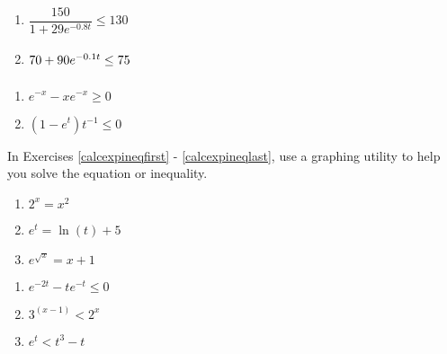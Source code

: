 \documentclass{ximera}
\begin{document}
\begin{multicols}{2} 
\begin{enumerate}
\setcounter{enumi}{\value{HW}}

\item $\dfrac{150}{1 + 29e^{-0.8t}} \leq 130$

\item $\vphantom{\dfrac{150}{1 + 29e^{-0.8t}}} 70 + 90e^{-0.1t} \leq 75$

\setcounter{HW}{\value{enumi}}
\end{enumerate}
\end{multicols}

\begin{multicols}{2} 
\begin{enumerate}
\setcounter{enumi}{\value{HW}}

\item $e^{-x} - xe^{-x} \geq 0$
\item $(1-e^{t}) t^{-1} \leq 0$ \label{expineqlast}

\setcounter{HW}{\value{enumi}}
\end{enumerate}
\end{multicols}

In Exercises \ref{calcexpineqfirst} - \ref{calcexpineqlast},  use a graphing utility to help you solve the equation or  inequality.

\begin{multicols}{3} 
\begin{enumerate}
\setcounter{enumi}{\value{HW}}

\item $2^{x} = x^2$ \label{calcexpineqfirst} 
\item $e^{t} = \ln(t) + 5$   
\item $e^{\sqrt{x}} = x + 1$ 

\setcounter{HW}{\value{enumi}}
\end{enumerate}
\end{multicols}

\begin{multicols}{3} 
\begin{enumerate}
\setcounter{enumi}{\value{HW}}

\item  $e^{-2t}-te^{-t} \leq 0$
\item $3^{(x - 1)} < 2^{x}$ 
\item $e^{t} < t^{3} - t$ \label{calcexpineqlast} 

\setcounter{HW}{\value{enumi}}
\end{enumerate}
\end{multicols}
\end{document}

